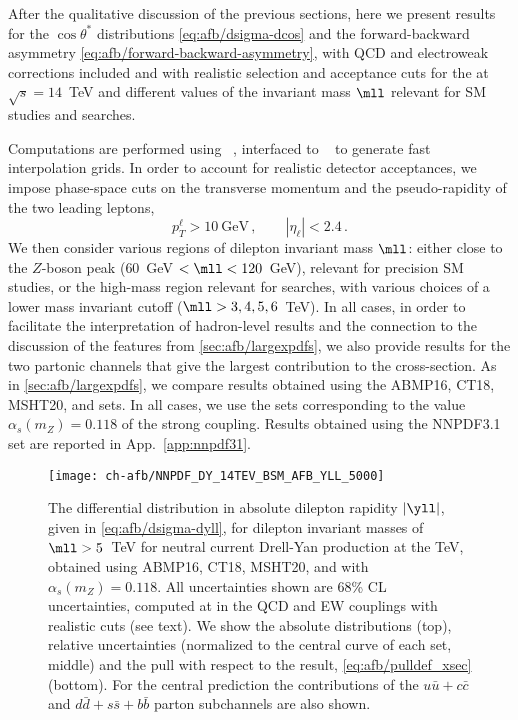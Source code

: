 
After the qualitative discussion of the previous sections, here we
present results for the $\cos\theta^*$
distributions \cref{eq:afb/dsigma-dcos} and the
forward-backward asymmetry \cref{eq:afb/forward-backward-asymmetry}, with
\nlo QCD and electroweak corrections included and
with realistic selection and acceptance cuts for the \lhc at $\sqrt{s} = 14$~TeV
and different values of the invariant mass $\mll$ relevant for SM
studies and \bsm searches.

Computations are performed using \mgamc~\cite{Alwall:2014hca},
interfaced to \pineappl~\cite{Carrazza:2020gss,christopher_schwan_2022_7023438} to generate
fast interpolation grids.
%
In order to account for realistic detector acceptances,
we impose phase-space cuts on the transverse momentum and the pseudo-rapidity of the two
leading leptons,
\begin{equation}
p_T^{\ell} > 10~{\text{GeV}}  \, ,\qquad |\eta_{\ell}| < 2.4 \,.
\end{equation}
We then consider various regions of dilepton invariant mass $\mll$:
either close to the $Z$-boson peak ($60$~GeV $< \mll < 120$~GeV),
relevant for precision SM studies, or the
high-mass region relevant for \bsm searches, with  various choices of a
lower mass invariant cutoff ($\mll > 3,4,5,6$~TeV).
%
In all cases, in order to facilitate the interpretation of
hadron-level results  and the connection to
the discussion of the \pdf features from \cref{sec:afb/largexpdfs},
we also provide results for the two partonic channels that give the
largest contribution to the cross-section.
%
As in \cref{sec:afb/largexpdfs}, we compare results obtained using
the  ABMP16, CT18, MSHT20, and  \pdf sets.
%
In all cases, we
use the  \nnlo sets corresponding to the value $\alpha_s(m_Z)=0.118$
of the strong coupling.
%
Results obtained using the NNPDF3.1 \pdf set are reported in App.~\ref{app:nnpdf31}.

\begin{figure}[!t]
 \centering
 \texttt{[image: ch-afb/NNPDF\_DY\_14TEV\_BSM\_AFB\_YLL\_5000]}
 \caption{The differential distribution in absolute dilepton rapidity $|\yll|$, given in
\cref{eq:afb/dsigma-dyll},
for dilepton invariant masses of $\mll > 5$~TeV
for neutral current Drell-Yan production at the
 TeV,
obtained using ABMP16, CT18, MSHT20, and  \nnlo \pdfs with $\alpha_s(m_Z)=0.118$.
%
All
uncertainties shown are 68\% CL \pdf uncertainties, computed at \nlo
in the QCD and EW couplings with realistic cuts (see text).
We show the absolute distributions (top), relative uncertainties (normalized
to the central curve of each set, middle) and the pull with respect to the
 result, \cref{eq:afb/pulldef_xsec} (bottom).
%
For the central  prediction
the contributions of the $u\bar{u}+c\bar{c}$ and $d\bar{d}+s\bar{s}+b\bar{b}$
parton subchannels are also shown.
 \label{fig:afb/CMS_DY_14TEV_MLL_5000_rap}}
\end{figure}

